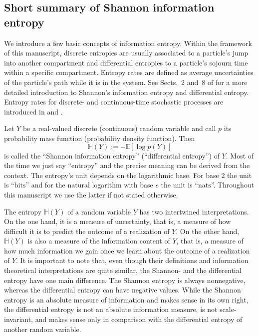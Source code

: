 \documentclass[smallextended]{svjour3}
\newcommand{\E}{\mathbb{E}}
\renewcommand{\H}{\mathbb{H}}
\newcommand{\bits}{\mathrm{bits}}
\newcommand{\nats}{\mathrm{nats}}
\newcommand{\ie}{that is}
\newcommand{\pdf}{probability density function}
\renewcommand{\emph}[1]{``#1''}
\begin{document}
\subsection{Short summary of Shannon information entropy}
\label{sec:entropy_basics}

We introduce a few basic concepts of information entropy.
Within the framework of this manuscript, discrete entropies are usually associated to a particle's jump into another compartment and differential entropies to a particle's sojourn time within a specific compartment.
Entropy rates are defined as average uncertainties of the particle's path while it is in the system.
See Sects.~2 and~8 of \citet{Cover2006} for a more detailed introduction to Shannon's information entropy and differential entropy.
Entropy rates for discrete- and continuous-time stochastic processes are introduced in \citet[Sect.~4][]{Cover2006} and \citet{Dumitrescu1988MICAS}. 

Let $Y$ be a real-valued discrete (continuous) random variable and call $p$ its probability mass function (\pdf).
Then
\begin{equation}
  \label{eqn:entropy}
  \H(Y) := -\E\left[\log p(Y)\right]
\end{equation}
is called the \emph{Shannon information entropy} (\emph{differential entropy}) of $Y$.
Most of the time we just say \emph{entropy} and the precise meaning can be derived from the context.
The entropy's unit depends on the logarithmic base.
For base $2$ the unit is \emph{$\bits$} and for the natural logarithm with base $e$ the unit is \emph{$\nats$}.
Throughout this manuscript we use the latter if not stated otherwise.

The entropy $\H(Y)$ of a random variable $Y$ has two intertwined interpretations.
On the one hand, it is a measure of uncertainty, \ie, a measure of how difficult it is to predict the outcome of a realization of $Y$.
On the other hand, $\H(Y)$ is also a measure of the information content of $Y$, \ie, a measure of how much information we gain once we learn about the outcome of a realization of $Y$.
It is important to note that, even though their definitions and information theoretical interpretations are quite similar, the Shannon- and the differential entropy have one main difference.
The Shannon entropy is always nonnegative, whereas the differential entropy can have negative values.
While the Shannon entropy is an absolute measure of information and makes sense in its own right, the differential entropy is not an absolute information measure, is not scale-invariant, and makes sense only in comparison with the differential entropy of another random variable.
\end{document}
